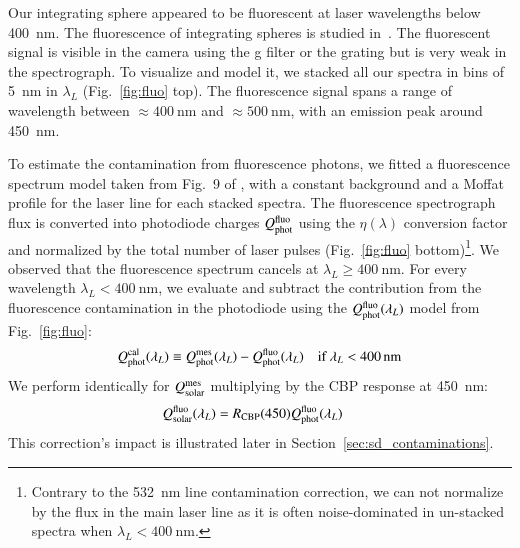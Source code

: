 Our integrating sphere appeared to be fluorescent at laser wavelengths below \SI{400}{\nano\meter}. The fluorescence of integrating spheres is studied in~\cite{shaw2007ultraviolet}. The fluorescent signal is visible in the \SD camera using the g filter or the grating but is very weak in the spectrograph. To visualize and model it, we stacked all our spectra in bins of \SI{5}{\nano\meter} in $\lambda_L$ (Fig.~\ref{fig:fluo} top). The fluorescence signal spans a range of wavelength between $\approx \SI{400}{\nano\meter}$ and $\approx\SI{500}{\nano\meter}$, with an emission peak around \SI{450}{\nano\meter}. %

To estimate the contamination from fluorescence photons, we fitted a fluorescence spectrum model taken from Fig.~9 of \cite{shaw2007ultraviolet}, with a constant background and a Moffat profile for the laser line for each stacked spectra. The fluorescence spectrograph flux is converted into photodiode charges $Q_{\mathrm{phot}}^{\mathrm{fluo}}$ using the $\eta(\lambda)$ conversion factor and normalized by the total number of laser pulses (Fig.~\ref{fig:fluo} bottom)\footnote{Contrary to the \SI{532}{\nano\meter} line contamination correction, we can not normalize by the flux in the main laser line as it is often noise-dominated in un-stacked spectra when $\lambda_L < \SI{400}{\nano\meter}$.}. We observed that the fluorescence spectrum cancels at $\lambda_L \geq \SI{400}{\nano\meter}$. For every wavelength $\lambda_L < \SI{400}{\nano\meter}$, we evaluate and subtract the contribution from the fluorescence contamination in the photodiode using the $Q_{\mathrm{phot}}^{\mathrm{fluo}}(\lambda_L)$ model from Fig.~\ref{fig:fluo}:
\begin{equation}
        Q_{\mathrm{phot}}^{\mathrm{cal}}(\lambda_L) \equiv  Q_{\mathrm{phot}}^{\mathrm{mes}}(\lambda_L) - Q_{\mathrm{phot}}^{\mathrm{fluo}}(\lambda_L) \quad\text{if}\ \lambda_L < \SI{400}{\nano\meter}
        \label{eq:qphot_calfluo}
\end{equation}
We perform identically for $Q_{\mathrm{solar}}^{\mathrm{mes}}$ multiplying by the CBP response at \SI{450}{\nano\meter}: 
\begin{equation}
\begin{aligned}
    Q_{\mathrm{solar}}^{\rm fluo}(\lambda_L) & = R_{\mathrm{CBP}}(450)  Q_{\mathrm{phot}}^{\rm fluo}(\lambda_L)
    \label{eq:qsolar_calfluo}
\end{aligned}
\end{equation}
This correction's impact is illustrated later in Section~\ref{sec:sd_contaminations}.

